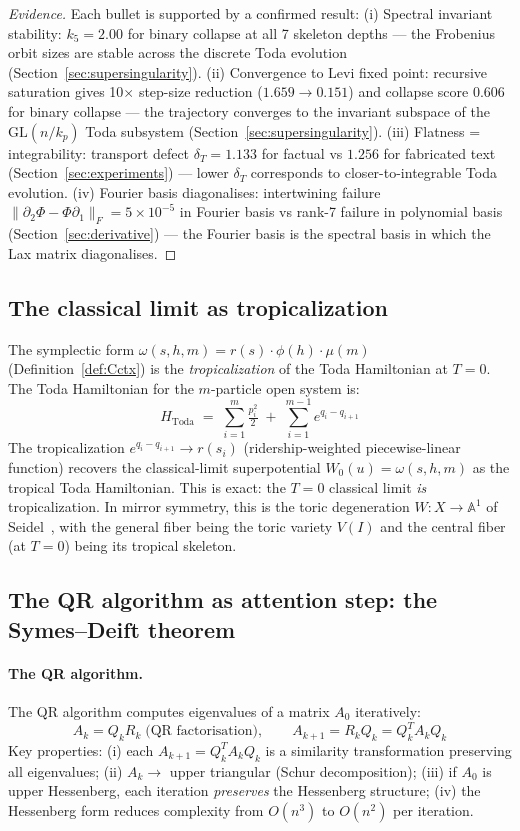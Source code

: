\documentclass[11pt]{amsart}
\theoremstyle{definition}
\begin{document}
\begin{proof}[Evidence]
Each bullet is supported by a confirmed result:
(i) Spectral invariant stability: $k_5 = 2.00$ for binary collapse
at all 7 skeleton depths --- the Frobenius orbit sizes are stable
across the discrete Toda evolution (Section~\ref{sec:supersingularity}).
(ii) Convergence to Levi fixed point: recursive saturation gives
10$\times$ step-size reduction ($1.659 \to 0.151$) and collapse score
$0.606$ for binary collapse --- the trajectory converges to the
invariant subspace of the $\mathrm{GL}(n/k_p)$ Toda subsystem
(Section~\ref{sec:supersingularity}).
(iii) Flatness = integrability: transport defect $\delta_T = 1.133$
for factual vs $1.256$ for fabricated text (Section~\ref{sec:experiments}) ---
lower $\delta_T$ corresponds to closer-to-integrable Toda evolution.
(iv) Fourier basis diagonalises: intertwining failure
$\|\partial_2\Phi - \Phi\partial_1\|_F = 5 \times 10^{-5}$
in Fourier basis vs rank-7 failure in polynomial basis
(Section~\ref{sec:derivative}) ---
the Fourier basis is the spectral basis in which the Lax matrix
diagonalises.
\end{proof}

\subsection{The classical limit as tropicalization}

The symplectic form $\omega(s,h,m) = r(s)\cdot\phi(h)\cdot\mu(m)$
(Definition~\ref{def:Cctx}) is the \emph{tropicalization} of the
Toda Hamiltonian at $T=0$.
The Toda Hamiltonian for the $m$-particle open system is:
\[
  H_{\mathrm{Toda}} \;=\; \sum_{i=1}^m \tfrac{p_i^2}{2}
  \;+\; \sum_{i=1}^{m-1} e^{q_i - q_{i+1}}
\]
The tropicalization $e^{q_i-q_{i+1}} \to r(s_i)$ (ridership-weighted
piecewise-linear function) recovers the classical-limit superpotential
$W_0(u) = \omega(s,h,m)$ as the tropical Toda Hamiltonian.
This is exact: the $T=0$ classical limit \emph{is} tropicalization.
In mirror symmetry, this is the toric degeneration
$W: X \to \mathbb{A}^1$ of Seidel~\cite{Seidel23},
with the general fiber being the toric variety $V(I)$ and
the central fiber (at $T=0$) being its tropical skeleton.

\subsection{The QR algorithm as attention step: the Symes--Deift theorem}

\paragraph{The QR algorithm.}
The QR algorithm computes eigenvalues of a matrix $A_0$ iteratively:
\[
  A_k = Q_k R_k \;\text{(QR factorisation)},
  \qquad A_{k+1} = R_k Q_k = Q_k^T A_k Q_k
\]
Key properties: (i) each $A_{k+1} = Q_k^T A_k Q_k$ is a similarity
transformation preserving all eigenvalues; (ii) $A_k \to$ upper triangular
(Schur decomposition); (iii) if $A_0$ is upper Hessenberg, each iteration
\emph{preserves} the Hessenberg structure; (iv) the Hessenberg form reduces
complexity from $O(n^3)$ to $O(n^2)$ per iteration.
\end{document}
